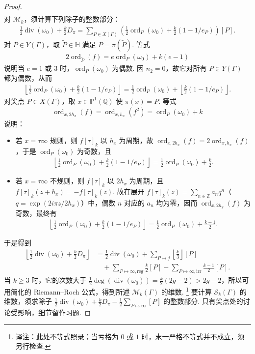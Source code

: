 \begin{proof}
\begin{align*}
\end{align*}
对 $\mathcal M_k$，须计算下列除子的整数部分：
\begin{align*}
\tfrac12\operatorname{div}(\omega_0)+\tfrac k2D_\pi=\sum_{P\in X(\Gamma)}\left(\tfrac12\operatorname{ord}_P(\omega_0)+\tfrac k2(1-1/e_P)\right)[P].
\end{align*}
对 $P\in Y(\Gamma)$，取 $\widetilde P\in\mathbb H$ 满足 $P=\pi(\widetilde P)$. 等式
\begin{align*}
2\operatorname{ord}_{\widetilde P}(f)=e\operatorname{ord}_P(\omega_0)+k(e-1)
\end{align*}
说明当 $e=1$ 或 $3$ 时，$\operatorname{ord}_P(\omega_0)$ 为偶数. 因 $n_2=0$，故它对所有 $P\in Y(\Gamma)$ 都为偶数，从而
\begin{align*}
\left\lfloor\tfrac12\operatorname{ord}_P(\omega_0)+\tfrac k2(1-1/e_P)\right\rfloor=\tfrac12\operatorname{ord}_P(\omega_0)+\left\lfloor\tfrac k2(1-1/e_P)\right\rfloor.
\end{align*}
对尖点 $P\in X(\Gamma)$，取 $x\in\mathbb P^1(\mathbb Q)$ 使 $\pi(x)=P$. 等式
\begin{align*}
\operatorname{ord}_{x,2h_x}(f)=\operatorname{ord}_{x,h_x}(f^2)=\operatorname{ord}_P(\omega_0)+k
\end{align*}
说明：
\begin{itemize}
\item 若 $x=\tau\infty$ 规则，则 $f[\tau]_k$ 以 $h_x$ 为周期，故 $\operatorname{ord}_{x,2h_x}(f)=2\operatorname{ord}_{x,h_x}(f)$，于是 $\operatorname{ord}_P(\omega_0)$ 为奇数，且
\begin{align*}
\left\lfloor\tfrac12\operatorname{ord}_P(\omega_0)+\tfrac k2(1-1/e_P)\right\rfloor=\tfrac12\operatorname{ord}_P(\omega_0)+\tfrac k2.
\end{align*}
\item 若 $x=\tau\infty$ 不规则，则 $f[\tau]_k$ 以 $2h_x$ 为周期，且 $f[\tau]_k(z+h_x)=-f[\tau]_k(z)$. 故在展开 $f[\tau]_k(z)=\sum_{n\in\mathbb Z}a_nq^n$（$q=\exp(2i\pi z/2h_x)$）中，偶数 $n$ 对应的 $a_n$ 均为零，因而 $\operatorname{ord}_{x,2h_x}(f)$ 为奇数，最终有
\begin{align*}
\left\lfloor\tfrac12\operatorname{ord}_P(\omega_0)+\tfrac k2(1-1/e_P)\right\rfloor=\tfrac12\operatorname{ord}_P(\omega_0)+\tfrac{k-1}{2}.
\end{align*}
\end{itemize}
于是得到
\begin{align*}
\left\lfloor\tfrac12\operatorname{div}(\omega_0)+\tfrac k2D_\pi\right\rfloor
&=\tfrac12\operatorname{div}(\omega_0)+\sum_{P\mapsto j}\left\lfloor\frac k3\right\rfloor[P]\\
&\quad+\sum_{P\mapsto\infty,\mathrm{reg}}\frac k2[P]+\sum_{P\mapsto\infty,\mathrm{irr}}\frac{k-1}{2}[P].
\end{align*}
当 $k\geqslant3$ 时，它的次数大于 $\frac12\deg(\operatorname{div}(\omega_0))=\frac k2(2g-2)>2g-2$，所以可用简化的 Riemann--Roch 公式，得到所述 $\mathcal M_k(\Gamma)$ 的维数.
\footnote{译注：此处不等式照录；当亏格为 $0$ 或 $1$ 时，末一严格不等式并不成立，须另行检查.}
要计算 $\mathcal S_k(\Gamma)$ 的维数，须求除子 $\frac12\operatorname{div}(\omega_0)+\frac k2D_\pi-\frac12\sum_{P\mapsto\infty}[P]$ 的整数部分. 只有尖点处的讨论受影响，细节留作习题.
\end{proof}
